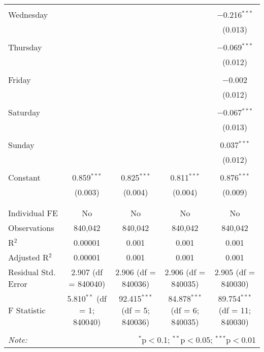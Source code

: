 \documentclass[
]{article}
\begin{document}
\begin{table}[!htbp]
{\begin{tabular}{@{\extracolsep{5pt}}lcccc}
  & & & & \\ 
 Wednesday &  &  &  & $-$0.216$^{***}$ \\ 
  &  &  &  & (0.013) \\ 
  & & & & \\ 
 Thursday &  &  &  & $-$0.069$^{***}$ \\ 
  &  &  &  & (0.012) \\ 
  & & & & \\ 
 Friday &  &  &  & $-$0.002 \\ 
  &  &  &  & (0.012) \\ 
  & & & & \\ 
 Saturday &  &  &  & $-$0.067$^{***}$ \\ 
  &  &  &  & (0.013) \\ 
  & & & & \\ 
 Sunday &  &  &  & 0.037$^{***}$ \\ 
  &  &  &  & (0.012) \\ 
  & & & & \\ 
 Constant & 0.859$^{***}$ & 0.825$^{***}$ & 0.811$^{***}$ & 0.876$^{***}$ \\ 
  & (0.003) & (0.004) & (0.004) & (0.009) \\ 
  & & & & \\ 
\hline \\[-1.8ex] 
Individual FE & No & No & No & No \\ 
Observations & 840,042 & 840,042 & 840,042 & 840,042 \\ 
R$^{2}$ & 0.00001 & 0.001 & 0.001 & 0.001 \\ 
Adjusted R$^{2}$ & 0.00001 & 0.001 & 0.001 & 0.001 \\ 
Residual Std. Error & 2.907 (df = 840040) & 2.906 (df = 840036) & 2.906 (df = 840035) & 2.905 (df = 840030) \\ 
F Statistic & 5.810$^{**}$ (df = 1; 840040) & 92.415$^{***}$ (df = 5; 840036) & 84.878$^{***}$ (df = 6; 840035) & 89.754$^{***}$ (df = 11; 840030) \\ 
\hline 
\hline \\[-1.8ex] 
\textit{Note:}  & \multicolumn{4}{r}{$^{*}$p$<$0.1; $^{**}$p$<$0.05; $^{***}$p$<$0.01} \\ 
\end{tabular}
} 
\end{table} 
\newpage
\end{document}

